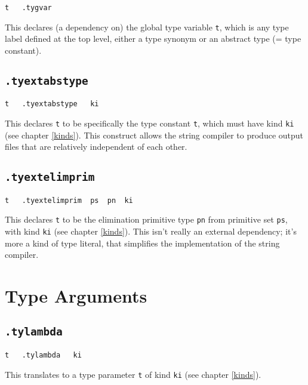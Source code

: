 \documentclass{report}
\newcommand\stringcode[1]{\texttt{#1}}
\begin{document}
\begin{verbatim}
t	.tygvar
\end{verbatim}

This declares (a dependency on) the global type variable \stringcode{t},
which is any type label defined at the top level, either a type synonym or an abstract type (= type constant).

\subsection{\stringcode{.tyextabstype}}

\begin{verbatim}
t	.tyextabstype	ki
\end{verbatim}

This declares \stringcode{t} to be specifically the type constant \stringcode{t},
which must have kind \stringcode{ki} (see chapter \ref{kinds}).
This construct allows the string compiler to produce output files that are relatively independent of each other.

\subsection{\stringcode{.tyextelimprim}}

\begin{verbatim}
t	.tyextelimprim	ps	pn	ki
\end{verbatim}

This declares \stringcode{t} to be the elimination primitive type \stringcode{pn} from primitive set \stringcode{ps},
with kind \stringcode{ki} (see chapter \ref{kinds}).
This isn't really an external dependency;
it's more a kind of type literal, that simplifies the implementation of the string compiler.

\section{Type Arguments}
\label{type_arg}

\subsection{\stringcode{.tylambda}}

\begin{verbatim}
t	.tylambda	ki
\end{verbatim}

This translates to a type parameter \stringcode{t} of kind \stringcode{ki} (see chapter \ref{kinds}).
\end{document}
